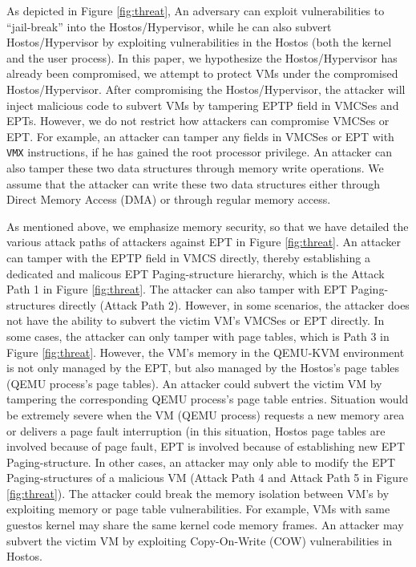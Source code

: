 As depicted in Figure \ref{fig:threat}, 
An adversary can exploit vulnerabilities to ``jail-break'' into the Hostos/Hypervisor, while he can also subvert Hostos/Hypervisor by exploiting vulnerabilities in the Hostos (both the kernel and the user process).
In this paper, we hypothesize the Hostos/Hypervisor has already been compromised, we attempt to protect VMs under the compromised Hostos/Hypervisor. 
After compromising the Hostos/Hypervisor, the attacker will inject malicious code to subvert VMs by tampering EPTP field in VMCSes and EPTs.
However, we do not restrict how attackers can compromise VMCSes or EPT. 
For example, an attacker can tamper any fields in VMCSes or EPT with \verb|VMX| instructions, if he has gained the root processor privilege. An attacker can also tamper these two data structures through memory write operations. We assume that the attacker can write these two data structures either through Direct Memory Access (DMA) or through regular memory access. 

As mentioned above, we emphasize memory security, so that we have detailed the various attack paths of attackers against EPT in Figure \ref{fig:threat}.
An attacker can tamper with the EPTP field in VMCS directly, thereby establishing a dedicated and malicous EPT Paging-structure hierarchy, which is the Attack Path 1 in Figure \ref{fig:threat}. 
The attacker can also tamper with EPT Paging-structures directly (Attack Path 2).
However, in some scenarios, the attacker does not have the ability to subvert the victim VM's VMCSes or EPT directly. 
In some cases, the attacker can only tamper with page tables, which is Path 3 in Figure \ref{fig:threat}. However, the VM's memory in the QEMU-KVM environment is not only managed by the EPT, but also managed by the Hostos's page tables (QEMU process's page tables). An attacker could subvert the victim VM by tampering the corresponding QEMU process's page table entries. Situation would be extremely severe when the VM (QEMU process) requests a new memory area or delivers a page fault interruption (in this situation, Hostos page tables are involved because of page fault, EPT is involved because of establishing new EPT Paging-structure. 
In other cases,  
an attacker may only able to modify the EPT Paging-structures of a malicious VM (Attack Path 4 and Attack Path 5 in Figure \ref{fig:threat}). 
The attacker could break the memory isolation between VM's by exploiting memory or page table vulnerabilities. For example, VMs with same guestos kernel may share the same kernel code memory frames. An attacker may subvert the victim VM by exploiting Copy-On-Write (COW) vulnerabilities in Hostos. 

